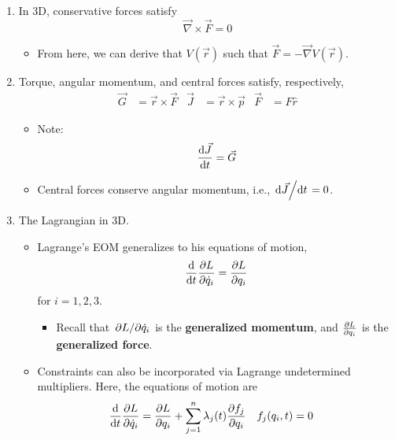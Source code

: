 \documentclass[../notes.tex]{subfiles}
\begin{document}
\begin{itemize}
    \begin{enumerate}
        \item In 3D, conservative forces satisfy
        \begin{equation*}
            \vec{\nabla}\times\vec{F} = 0
        \end{equation*}
        \begin{itemize}
            \item From here, we can derive that $V(\vec{r})$ such that $\vec{F}=-\vec{\nabla}V(\vec{r})$.
        \end{itemize}
        \item Torque, angular momentum, and central forces satisfy, respectively,
        \begin{align*}
            \vec{G} &= \vec{r}\times\vec{F}&
            \vec{J} &= \vec{r}\times\vec{p}&
            \vec{F} &= F\hat{r}
        \end{align*}
        \begin{itemize}
            \item Note:
            \begin{equation*}
                \dv{\vec{J}}{t} = \vec{G}
            \end{equation*}
            \item Central forces conserve angular momentum, i.e., $\dv*{\vec{J}}{t}=0$.
        \end{itemize}
        \item The Lagrangian in 3D.
        \begin{itemize}
            \item Lagrange's EOM generalizes to his equations of motion,
            \begin{equation*}
                \dv{t}\pdv{L}{\dot{q}_i} = \pdv{L}{q_i}
            \end{equation*}
            for $i=1,2,3$.
            \begin{itemize}
                \item Recall that $\pdv*{L}{\dot{q}_i}$ is the \textbf{generalized momentum}, and $\pdv{L}{q_i}$ is the \textbf{generalized force}.
            \end{itemize}
            \item Constraints can also be incorporated via Lagrange undetermined multipliers. Here, the equations of motion are
            \begin{align*}
                \dv{t}\pdv{L}{\dot{q}_i} &= \pdv{L}{q_i}+\sum_{j=1}^n\lambda_j(t)\pdv{f_j}{q_i}&
                f_j(q_i,t) &= 0

\end{align*}
\end{itemize}
\end{enumerate}
\end{itemize}
\end{document}
